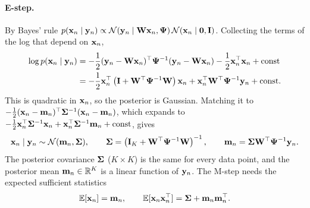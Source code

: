 \paragraph{E-step.} By Bayes' rule $p(\mathbf{x}_n\mid\mathbf{y}_n)\propto\mathcal{N}(\mathbf{y}_n\mid\mathbf{W}\mathbf{x}_n,\boldsymbol{\Psi})\,\mathcal{N}(\mathbf{x}_n\mid\mathbf{0},\mathbf{I})$. Collecting the terms of the log that depend on $\mathbf{x}_n$,
\begin{align}
  \log p(\mathbf{x}_n\mid\mathbf{y}_n) &= -\frac12(\mathbf{y}_n-\mathbf{W}\mathbf{x}_n)^\top\boldsymbol{\Psi}^{-1}(\mathbf{y}_n-\mathbf{W}\mathbf{x}_n)-\frac12\mathbf{x}_n^\top\mathbf{x}_n+\text{const} \nonumber\\
  &= -\frac12\mathbf{x}_n^\top\left(\mathbf{I}+\mathbf{W}^\top\boldsymbol{\Psi}^{-1}\mathbf{W}\right)\mathbf{x}_n+\mathbf{x}_n^\top\mathbf{W}^\top\boldsymbol{\Psi}^{-1}\mathbf{y}_n+\text{const}.
\end{align}
This is quadratic in $\mathbf{x}_n$, so the posterior is Gaussian. Matching it to $-\frac12(\mathbf{x}_n-\mathbf{m}_n)^\top\boldsymbol{\Sigma}^{-1}(\mathbf{x}_n-\mathbf{m}_n)$, which expands to $-\frac12\mathbf{x}_n^\top\boldsymbol{\Sigma}^{-1}\mathbf{x}_n+\mathbf{x}_n^\top\boldsymbol{\Sigma}^{-1}\mathbf{m}_n+\text{const}$, gives
\begin{equation}
  \mathbf{x}_n\mid\mathbf{y}_n\sim\mathcal{N}(\mathbf{m}_n,\boldsymbol{\Sigma}), \qquad \boldsymbol{\Sigma}=\left(\mathbf{I}_K+\mathbf{W}^\top\boldsymbol{\Psi}^{-1}\mathbf{W}\right)^{-1}, \qquad \mathbf{m}_n=\boldsymbol{\Sigma}\mathbf{W}^\top\boldsymbol{\Psi}^{-1}\mathbf{y}_n.
  \label{eq:fa_estep}
\end{equation}
The posterior covariance $\boldsymbol{\Sigma}$ ($K\times K$) is the same for every data point, and the posterior mean $\mathbf{m}_n\in\mathbb{R}^K$ is a linear function of $\mathbf{y}_n$. The M-step needs the expected sufficient statistics
\begin{equation}
  \mathbb{E}[\mathbf{x}_n]=\mathbf{m}_n, \qquad \mathbb{E}[\mathbf{x}_n\mathbf{x}_n^\top]=\boldsymbol{\Sigma}+\mathbf{m}_n\mathbf{m}_n^\top.
\end{equation}

